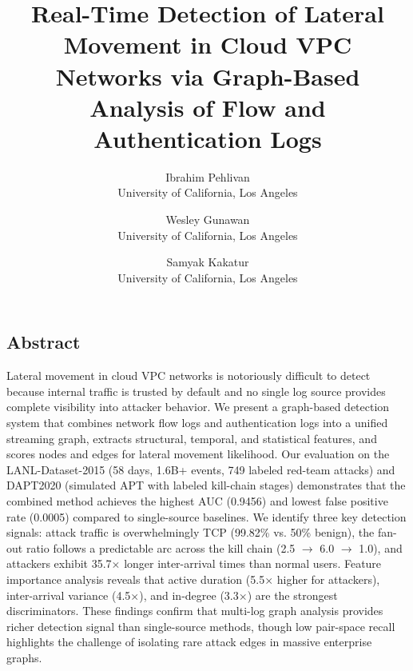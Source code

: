 \documentclass[letterpaper,twocolumn,10pt]{article}
\begin{document}
\date{}

\title{\Large \bf Real-Time Detection of Lateral Movement in Cloud VPC Networks via Graph-Based Analysis of Flow and Authentication Logs}

\author{
{\rm Ibrahim Pehlivan}\\
University of California, Los Angeles
\and
{\rm Wesley Gunawan}\\
University of California, Los Angeles
\and
{\rm Samyak Kakatur}\\
University of California, Los Angeles
}

\maketitle

\thispagestyle{empty}

\subsection*{Abstract}

Lateral movement in cloud VPC networks is notoriously difficult to detect because internal traffic is trusted by default and no single log source provides complete visibility into attacker behavior. We present a graph-based detection system that combines network flow logs and authentication logs into a unified streaming graph, extracts structural, temporal, and statistical features, and scores nodes and edges for lateral movement likelihood. Our evaluation on the LANL-Dataset-2015 (58 days, 1.6B+ events, 749 labeled red-team attacks) and DAPT2020 (simulated APT with labeled kill-chain stages) demonstrates that the combined method achieves the highest AUC (0.9456) and lowest false positive rate (0.0005) compared to single-source baselines. We identify three key detection signals: attack traffic is overwhelmingly TCP (99.82\% vs. 50\% benign), the fan-out ratio follows a predictable arc across the kill chain (2.5 $\rightarrow$ 6.0 $\rightarrow$ 1.0), and attackers exhibit 35.7$\times$ longer inter-arrival times than normal users. Feature importance analysis reveals that active duration (5.5$\times$ higher for attackers), inter-arrival variance (4.5$\times$), and in-degree (3.3$\times$) are the strongest discriminators. These findings confirm that multi-log graph analysis provides richer detection signal than single-source methods, though low pair-space recall highlights the challenge of isolating rare attack edges in massive enterprise graphs.
\end{document}
